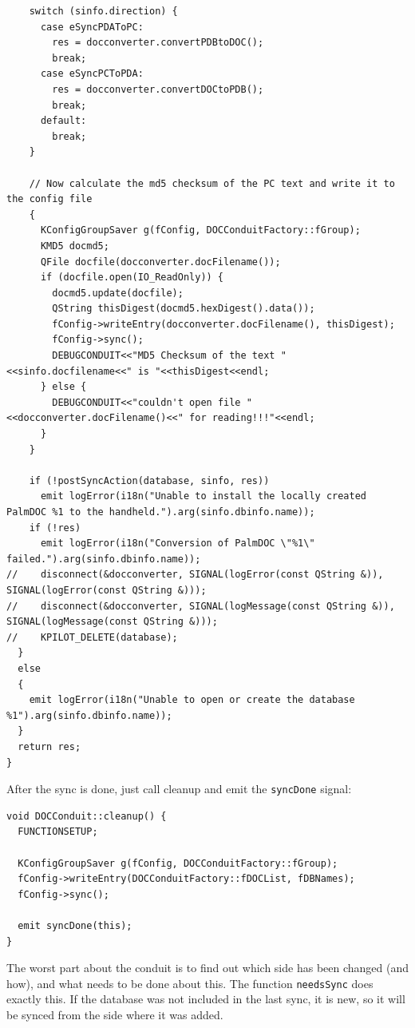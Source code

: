 \documentclass[10pt,a4paper]{article}
\newcommand{\code}[1]{{\small\texttt{#1}}}
\begin{document}
{\begin{verbatim}
    switch (sinfo.direction) {
      case eSyncPDAToPC:
        res = docconverter.convertPDBtoDOC();
        break;
      case eSyncPCToPDA:
        res = docconverter.convertDOCtoPDB();
        break;
      default:
        break;
    }
    
    // Now calculate the md5 checksum of the PC text and write it to the config file
    {
      KConfigGroupSaver g(fConfig, DOCConduitFactory::fGroup);
      KMD5 docmd5;
      QFile docfile(docconverter.docFilename());
      if (docfile.open(IO_ReadOnly)) {
        docmd5.update(docfile);
        QString thisDigest(docmd5.hexDigest().data());
        fConfig->writeEntry(docconverter.docFilename(), thisDigest);
        fConfig->sync();
        DEBUGCONDUIT<<"MD5 Checksum of the text "<<sinfo.docfilename<<" is "<<thisDigest<<endl;
      } else {
        DEBUGCONDUIT<<"couldn't open file "<<docconverter.docFilename()<<" for reading!!!"<<endl;
      }
    }
    
    if (!postSyncAction(database, sinfo, res)) 
      emit logError(i18n("Unable to install the locally created PalmDOC %1 to the handheld.").arg(sinfo.dbinfo.name));
    if (!res)
      emit logError(i18n("Conversion of PalmDOC \"%1\" failed.").arg(sinfo.dbinfo.name));
//    disconnect(&docconverter, SIGNAL(logError(const QString &)), SIGNAL(logError(const QString &)));
//    disconnect(&docconverter, SIGNAL(logMessage(const QString &)), SIGNAL(logMessage(const QString &)));
//    KPILOT_DELETE(database);
  }
  else
  {
    emit logError(i18n("Unable to open or create the database %1").arg(sinfo.dbinfo.name));
  }
  return res;
}

\end{verbatim}
}


After the sync is done, just call cleanup and emit the \code{syncDone} signal:

{\footnotesize
\begin{verbatim}
void DOCConduit::cleanup() {
  FUNCTIONSETUP;
  
  KConfigGroupSaver g(fConfig, DOCConduitFactory::fGroup);
  fConfig->writeEntry(DOCConduitFactory::fDOCList, fDBNames);
  fConfig->sync();

  emit syncDone(this);
}
\end{verbatim}
}



The worst part about the conduit is to find out which side has been changed (and how), and what needs to be done about this. The function \code{needsSync} does exactly this. If the database was not included in the last sync, it is new, so it will be synced from the side where it was added. 
\end{document}
